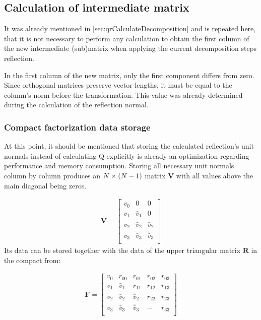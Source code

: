 
\subsection{Calculation of intermediate matrix}
\label{sec:qrOptimizationsFirstColumn}

It was already mentioned in \cref{sec:qrCalculateDecomposition} and is repeated here, that it is not necessary to perform any calculation to obtain the first column of the new intermediate (sub)matrix when applying the current decomposition steps reflection.

In the first column of the new matrix, only the first component differs from zero.
Since orthogonal matrices preserve vector lengths, it must be equal to the column's norm before the transformation.
This value was already determined during the calculation of the reflection normal.




\subsubsection{Compact factorization data storage}
\label{sec:qrOptimizationsCompactData}

At this point, it should be mentioned that storing the calculated reflection's unit normals instead of calculating Q explicitly is already an optimization regarding performance and memory consumption.
Storing all necessary unit normals column by column produces an $N \times \left(N-1\right)$ matrix $\mathbf{V}$ with all values above the main diagonal being zeros.

\begin{align}
\mathbf{V} = 
\begin{bmatrix}
v_0 & 0         & 0\\
v_1 & \bar{v}_1 & 0\\
v_2 & \bar{v}_2 & \bar{\bar{v}}_2 \\
v_3 & \bar{v}_3 & \bar{\bar{v}}_3 \\
\end{bmatrix}
\end{align}
%
Its data can be stored together with the data of the upper triangular matrix $\mathbf{R}$ in the compact from:

\begin{align}
\mathbf{F} = 
\begin{bmatrix}
	v_0 & r_{00}    & r_{01}          & r_{02} & r_{03} \\
	v_1 & \bar{v}_1 & r_{11}          & r_{12} & r_{13} \\
	v_2 & \bar{v}_2 & \bar{\bar{v}}_2 & r_{22} & r_{23} \\
	v_3 & \bar{v}_3 & \bar{\bar{v}}_3 & -      & r_{33} \\
\end{bmatrix}
\end{align}




